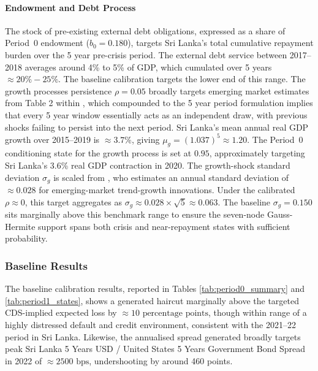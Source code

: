 \documentclass[11pt]{article}
\theoremstyle{definition}
\theoremstyle{plain}
\theoremstyle{remark}
\begin{document}
\paragraph{Endowment and Debt Process}

The stock of pre-existing external debt obligations, expressed as a share of Period~0 endowment ($b_0=0.180$), targets Sri Lanka's 
total cumulative repayment burden over the 5 year pre-crisis period. The external debt service between 2017--2018 averages around 4\% to 5\% of GDP, which cumulated over 5 years $\approx20\%-25\%$. The baseline calibration targets the lower end of this range. The growth processes persistence $\rho=0.05$ broadly targets emerging market estimates from Table 2 within \citet{aguiar_emerging_2007}, which compounded to the 5 year period formulation implies that every 5 year window essentially acts as an independent draw, with previous shocks failing to persist into the next period. Sri Lanka's mean annual real GDP growth over 2015--2019 is $\approx 3.7\%$, giving $\mu_g = (1.037)^5 \approx 1.20$. The Period~0 conditioning state for the growth process is set at $0.95$, approximately targeting Sri Lanka's 3.6\% real GDP contraction in 2020. The growth-shock standard deviation $\sigma_g$ is scaled from \citet{aguiar_emerging_2007}, who estimates an annual standard deviation of $\approx 0.028$ for emerging-market trend-growth innovations. Under the calibrated $\rho \approx 0$, this target aggregates as $\sigma_g \approx 0.028 × \sqrt5 \approx 0.063$. The baseline $\sigma_g = 0.150$ sits marginally above this benchmark range to ensure the seven-node Gauss-Hermite support spans both crisis and near-repayment states with sufficient probability.



\subsubsection*{Baseline Results}

The baseline calibration results, reported in Tables \ref{tab:period0_summary} and \ref{tab:period1_states}, shows a generated haircut marginally above the targeted CDS-implied expected loss by $\approx 10 \text{ percentage points}$, though within range of a highly distressed default and credit environment, consistent with the 2021--22 period in Sri Lanka. Likewise, the annualised spread generated broadly targets peak Sri Lanka 5 Years USD / United States 5 Years Government Bond Spread in 2022 of $\approx 2500\text{ bps}$, undershooting by around 460 points. \\
\end{document}
